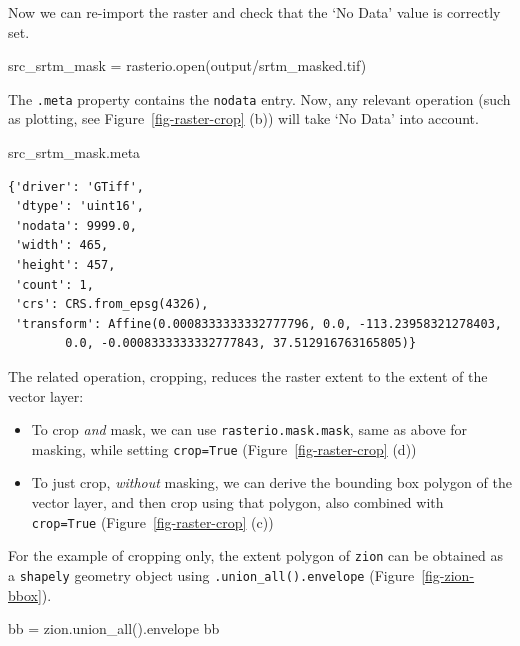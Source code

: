 \documentclass[
  letterpaper,
]{krantz}
\newenvironment{Shaded}{\begin{snugshade}}{\end{snugshade}}
\newcommand{\BuiltInTok}[1]{\textcolor[rgb]{0.00,0.23,0.31}{#1}}
\newcommand{\NormalTok}[1]{\textcolor[rgb]{0.00,0.23,0.31}{#1}}
\newcommand{\OperatorTok}[1]{\textcolor[rgb]{0.37,0.37,0.37}{#1}}
\newcommand{\StringTok}[1]{\textcolor[rgb]{0.13,0.47,0.30}{#1}}
\providecommand{\tightlist}{%
  \setlength{\itemsep}{0pt}\setlength{\parskip}{0pt}}\usepackage{longtable,booktabs,array}
\begin{document}
Now we can re-import the raster and check that the `No Data' value is
correctly set.

\begin{Shaded}
\begin{Highlighting}[]
\NormalTok{src\_srtm\_mask }\OperatorTok{=}\NormalTok{ rasterio.}\BuiltInTok{open}\NormalTok{(}\StringTok{\textquotesingle{}output/srtm\_masked.tif\textquotesingle{}}\NormalTok{)}
\end{Highlighting}
\end{Shaded}

The \texttt{.meta} property contains the \texttt{nodata} entry. Now, any
relevant operation (such as plotting, see Figure~\ref{fig-raster-crop}
(b)) will take `No Data' into account.

\begin{Shaded}
\begin{Highlighting}[]
\NormalTok{src\_srtm\_mask.meta}
\end{Highlighting}
\end{Shaded}

\begin{verbatim}
{'driver': 'GTiff',
 'dtype': 'uint16',
 'nodata': 9999.0,
 'width': 465,
 'height': 457,
 'count': 1,
 'crs': CRS.from_epsg(4326),
 'transform': Affine(0.0008333333332777796, 0.0, -113.23958321278403,
        0.0, -0.0008333333332777843, 37.512916763165805)}
\end{verbatim}

The related operation, cropping, reduces the raster extent to the extent
of the vector layer:

\begin{itemize}
\tightlist
\item
  To crop \emph{and} mask, we can use \texttt{rasterio.mask.mask}, same
  as above for masking, while setting \texttt{crop=True}
  (Figure~\ref{fig-raster-crop} (d))
\item
  To just crop, \emph{without} masking, we can derive the bounding box
  polygon of the vector layer, and then crop using that polygon, also
  combined with \texttt{crop=True} (Figure~\ref{fig-raster-crop} (c))
\end{itemize}

For the example of cropping only, the extent polygon of \texttt{zion}
can be obtained as a \texttt{shapely} geometry object using
\texttt{.union\_all().envelope} (Figure~\ref{fig-zion-bbox}).

\begin{Shaded}
\begin{Highlighting}[]
\NormalTok{bb }\OperatorTok{=}\NormalTok{ zion.union\_all().envelope}
\NormalTok{bb}
\end{Highlighting}
\end{Shaded}
\end{document}
